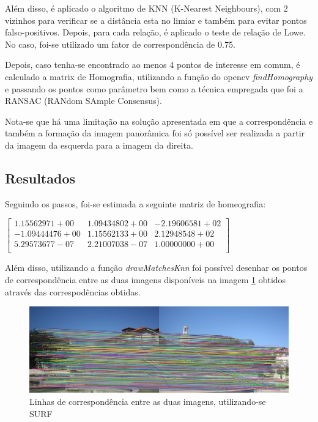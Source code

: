 \documentclass{article}
\begin{document}
Além disso, é aplicado o algoritmo de KNN (K-Nearest Neighbours), com 2 vizinhos para verificar se a distância esta no limiar e também para evitar pontos falso-positivos. Depois, para cada relação, é aplicado o teste de relação de Lowe. No caso, foi-se utilizado um fator de correspondência de 0.75.

Depois, caso tenha-se encontrado ao menos 4 pontos de interesse em comum, é calculado a matrix de Homografia, utilizando a função do opencv \textit{findHomography} e passando os pontos como parâmetro bem como a técnica empregada que foi a RANSAC (RANdom SAmple Consensus).

Nota-se que há uma limitação na solução apresentada em que a correspondência e também a formação da imagem panorâmica foi só possível ser realizada a partir da imagem da esquerda para a imagem da direita.

\subsection{Resultados}

Seguindo os passos, foi-se estimada a seguinte matriz de homeografia:

\begin{center}
  $
  \begin{bmatrix}

    1.15562971+00 & 1.09434802+00 & -2.19606581+02 \\ 
 
    -1.09444476+00 & 1.15562133+00 & 2.12948548+02 \\ 
 
    5.29573677-07 &  2.21007038-07 & 1.00000000+00 \\ 
 
  \end{bmatrix}
  $
\end{center}

Além disso, utilizando a função \textit{drawMatchesKnn} foi possível desenhar os pontos de correspondência entre as duas imagens disponíveis na imagem \ref{Fig:relacao} obtidos através das correspodências obtidas.

\begin{figure}[!htb]
  \centering
  \includegraphics[width=.8\linewidth]{relation.jpeg}
  \caption{Linhas de correspondência entre as duas imagens, utilizando-se SURF}\label{Fig:relacao}
\end{figure}
\end{document}
